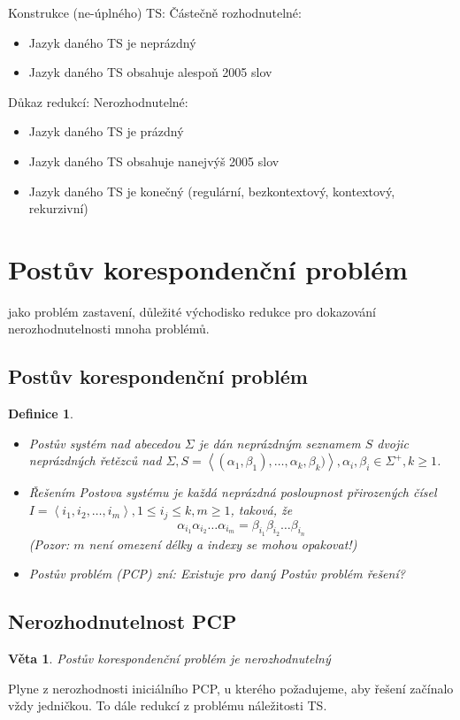 \documentclass[a4paper, 11pt]{report}
\newtheorem{mydef}{Definice}[chapter]
\newtheorem{veta}{Věta}[chapter]
\begin{document}
Konstrukce (ne-úplného) TS: Částečně rozhodnutelné:
\begin{itemize}
	\item Jazyk daného TS je neprázdný
	\item Jazyk daného TS obsahuje alespoň 2005 slov
\end{itemize}

Důkaz redukcí: Nerozhodnutelné:
\begin{itemize}
	\item Jazyk daného TS je prázdný
	\item Jazyk daného TS obsahuje nanejvýš 2005 slov
	\item Jazyk daného TS je konečný (regulární, bezkontextový, kontextový, rekurzivní)
\end{itemize}

\section{Postův korespondenční problém}
jako problém zastavení, důležité východisko redukce pro dokazování nerozhodnutelnosti mnoha problémů.

\subsection{Postův korespondenční problém}
\begin{mydef}
\begin{itemize}
	\item \emph{Postův systém} nad abecedou $\Sigma$ je dán neprázdným seznamem $S$ dvojic neprázdných řetězců nad $\Sigma, S = \left<(\alpha_1, \beta_1), \dots,\alpha_k, \beta_k)\right>, \alpha_i, \beta_i \in \Sigma^+, k \geq 1$.
	\item Řešením \emph{Postova systému} je každá neprázdná posloupnost přirozených čísel $I = \left<i_1, i_2, \dots, i_m\right>, 1 \leq i_j \leq k, m \geq 1$, taková, že
	$$\alpha_{i_1}\alpha_{i_2}\dots\alpha_{i_m} = \beta_{i_1}\beta_{i_2}\dots\beta_{i_n}$$
	(Pozor: $m$ není omezení délky a indexy se mohou opakovat!)
	\item Postův problém (PCP) zní: Existuje pro daný Postův problém řešení?
\end{itemize}
\end{mydef}

\subsection{Nerozhodnutelnost PCP}
\begin{veta}
Postův korespondenční problém je nerozhodnutelný
\end{veta}
Plyne z nerozhodnosti iniciálního PCP, u kterého požadujeme, aby řešení začínalo vždy jedničkou. To dále redukcí z problému náležitosti TS.
\end{document}
